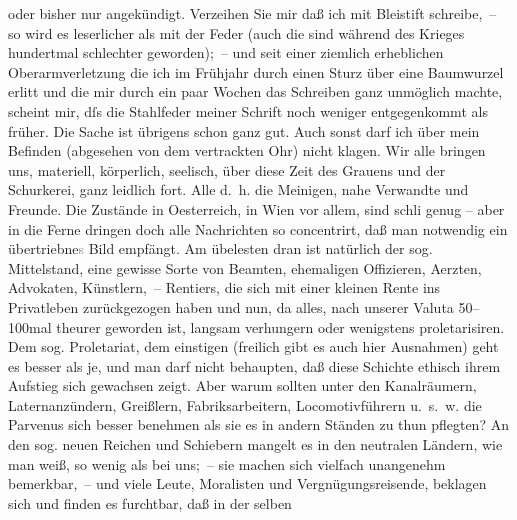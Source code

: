 \begin{ledgroupsized}[t]{13cm}
                    oder bisher nur angekündigt.\pend
           \pstart
           Verzeihen Sie mir daß ich mit Bleistift schreibe, – so wird es leserlicher als
                    mit der Feder (auch die sind während des Krieges hundertmal schlechter
                    geworden); – und seit einer ziemlich erheblichen Oberarmverletzung die ich im
                    Frühjahr durch einen Sturz über eine Baumwurzel erlitt und die mir durch ein
                    paar Wochen das Schreiben ganz unmöglich machte, scheint mir, dſs die Stahlfeder
                    meiner Schrift noch weniger entgegenkommt als früher. Die Sache ist übrigens
                    schon ganz gut. Auch sonst darf ich über mein Befinden (abgesehen von dem
                    vertrackten Ohr) nicht klagen. Wir alle bringen uns, materiell, körperlich,
                    seelisch, über diese Zeit des Grauens und der Schurkerei, ganz leidlich fort.
                    Alle {\dotstwo} d. h. die {\pb}Meinigen, nahe Verwandte und Freunde. Die Zustände in Oesterreich, in Wien vor
                    allem, sind schli{\geminationm} genug – aber in die Ferne
                    dringen doch alle Nachrichten so concentrirt, daß man notwendig ein
                        übertriebne\textcolor{gray}{s} Bild empfängt. Am übelesten \introOben{}dran\introOben{} ist natürlich der sog. Mittelstand, eine gewisse
                    Sorte von Beamten, ehemaligen Offizieren, Aerzten, Advokaten, Künstlern, –
                    Rentiers, die sich mit einer kleinen Rente ins Privatleben zurückgezogen haben
                    und nun, da alles, nach unserer Valuta 50–100mal theurer geworden ist, langsam
                    verhungern oder wenigstens proletarisiren. Dem sog. Proletariat, dem einstigen
                    (freilich gibt es auch hier Ausnahmen) geht es besser als je, und man darf nicht
                    behaupten, daß diese Schichte ethisch ihrem Aufstieg sich gewachsen zeigt. Aber
                        \introOben{}warum\introOben{} sollten unter den Kanalräumern,
                    Laternanzündern, Greißlern, Fabriksarbeitern, Locomotivführern u. s. w. die
                    Parvenus sich besser benehmen als sie es in andern Ständen zu thun pflegten? {\pb}An den sog. neuen Reichen und Schiebern
                    mangelt es in den neutralen Ländern, wie man weiß, so wenig als bei uns; – sie
                    machen sich vielfach unangenehm bemerkbar, – und viele Leute, Moralisten und
                    Vergnügungsreisende, beklagen sich und finden es furchtbar, daß in der selben

\end{ledgroupsized}

